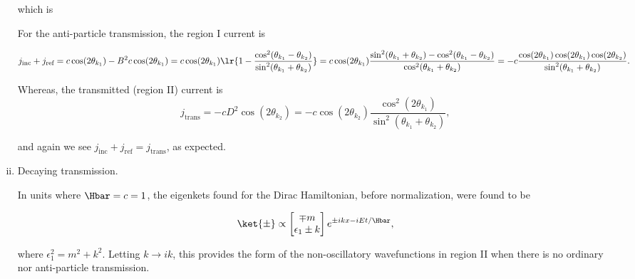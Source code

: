 \begin{enumerate}[(i)]
which is

For the anti-particle transmission, the region I current is

\begin{dmath}\label{eqn:gradQuantumProblemSet4Problem3:1001}
j_{\textrm{inc}}
+ j_{\textrm{ref}}
=
c \cos( 2 \theta_{k_1} ) - B^2 c \cos( 2 \theta_{k_1} )
=
c \cos( 2 \theta_{k_1} )
\lr{ 1 -
\frac{ \cos^2(\theta_{k_1} - \theta_{k_2}) }{\sin^2(\theta_{k_1} + \theta_{k_2})} }
=
c \cos( 2 \theta_{k_1} )
\frac{ \sin^2(\theta_{k_1} + \theta_{k_2}) - \cos^2(\theta_{k_1} - \theta_{k_2}) }{\cos^2(\theta_{k_1} + \theta_{k_2})}
=
-c
\frac{ \cos( 2 \theta_{k_1} ) \cos(2 \theta_{k_1}) \cos(2 \theta_{k_2})}
{\sin^2(\theta_{k_1} + \theta_{k_2})}.
\end{dmath}

Whereas, the transmitted (region II) current is
\begin{dmath}\label{eqn:gradQuantumProblemSet4Problem3:1021}
j_{\textrm{trans}}
=
 -c D^2 \cos( 2 \theta_{k_2} )
=
 -c \cos( 2 \theta_{k_2} )
\frac{ \cos^2(2 \theta_{k_1}) }{\sin^2(\theta_{k_1} + \theta_{k_2})},
\end{dmath}

and again we see \( j_{\textrm{inc}} + j_{\textrm{ref}} = j_{\textrm{trans}} \), as expected.

\item Decaying transmission.

In units where \( \Hbar = c = 1 \), the eigenkets found for the Dirac Hamiltonian, before normalization, were found to be

\begin{dmath}\label{eqn:gradQuantumProblemSet4Problem3:1041}
\ket{\pm} \propto
\begin{bmatrix}
\mp m \\
\epsilon_1 \pm k
\end{bmatrix}
e^{\pm i k x - i E t/\Hbar},
\end{dmath}

where \( \epsilon_1^2 = m^2 + k^2 \).  Letting \( k \rightarrow i k \), this provides the form of the non-oscillatory wavefunctions in region II when there is no ordinary nor anti-particle transmission.


\end{enumerate}
